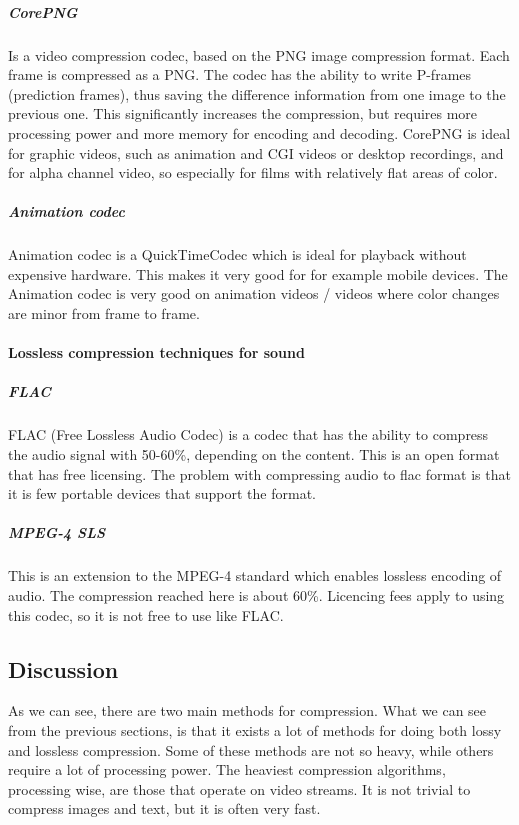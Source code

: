 \subparagraph{CorePNG} \hfill
\newline
Is a video compression codec, based on the PNG image compression format. Each frame is compressed as a PNG. The codec has the ability to write P-frames (prediction frames), thus saving the difference information from one image to the previous one. This significantly increases the compression, but requires more processing power and more memory for encoding and decoding. CorePNG is ideal for graphic videos, such as animation and CGI videos or desktop recordings, and for alpha channel video, so especially for films with relatively flat areas of color. \cite{bib:corePNG}

\subparagraph{Animation codec} \hfill
\newline
Animation codec is a QuickTimeCodec which is ideal for playback without expensive hardware.  This makes it very good for for example mobile devices. The Animation codec is very good on animation videos / videos where color changes are minor from frame to frame.
 \cite{bib:animationCodec}

\paragraph{Lossless compression techniques for sound}

\subparagraph{FLAC}\hfill
\newline
FLAC (Free Lossless Audio Codec) is a codec that has the ability to compress the audio signal with 50-60\%, depending on the content. This is an open format that has free licensing. The problem with compressing audio to flac format is that it is few portable devices that support the format. \cite{bib:FLAC}

\subparagraph{MPEG-4 SLS}\hfill
\newline
This is an extension to the MPEG-4 standard which enables lossless encoding of audio. The compression reached here is about 60\%. Licencing fees apply to using this codec, so it is not free to use like FLAC. \cite{bib:MPEGSLS}

\subsection{Discussion}
As we can see, there are two main methods for compression. What we can see from the previous sections, is that it exists a lot of methods for doing both lossy and lossless compression. Some of these methods are not so heavy, while others require a lot of processing power. The heaviest compression algorithms, processing wise, are those that operate on video streams. It is not trivial to compress images and text, but it is often very fast.

